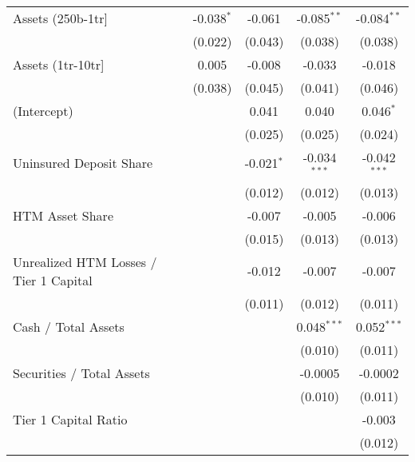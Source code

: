 \begin{table}[htbp]
\begin{adjustbox}{width = 1\textwidth, center}
\begin{tabular}{lcccc}
         Assets (250b-1tr]                      & -0.038$^{*}$  & -0.061       & -0.085$^{**}$  & -0.084$^{**}$\\   
                                                & (0.022)       & (0.043)      & (0.038)        & (0.038)\\   
         Assets (1tr-10tr]                      & 0.005         & -0.008       & -0.033         & -0.018\\   
                                                & (0.038)       & (0.045)      & (0.041)        & (0.046)\\   
         (Intercept)                            &               & 0.041        & 0.040          & 0.046$^{*}$\\   
                                                &               & (0.025)      & (0.025)        & (0.024)\\   
         Uninsured Deposit Share                &               & -0.021$^{*}$ & -0.034$^{***}$ & -0.042$^{***}$\\   
                                                &               & (0.012)      & (0.012)        & (0.013)\\   
         HTM Asset Share                        &               & -0.007       & -0.005         & -0.006\\   
                                                &               & (0.015)      & (0.013)        & (0.013)\\   
         Unrealized HTM Losses / Tier 1 Capital &               & -0.012       & -0.007         & -0.007\\   
                                                &               & (0.011)      & (0.012)        & (0.011)\\   
         Cash / Total Assets                    &               &              & 0.048$^{***}$  & 0.052$^{***}$\\   
                                                &               &              & (0.010)        & (0.011)\\   
         Securities / Total Assets              &               &              & -0.0005        & -0.0002\\   
                                                &               &              & (0.010)        & (0.011)\\   
         Tier 1 Capital Ratio                   &               &              &                & -0.003\\   
                                                &               &              &                & (0.012)\\   

\end{tabular}
\end{adjustbox}
\end{table}
